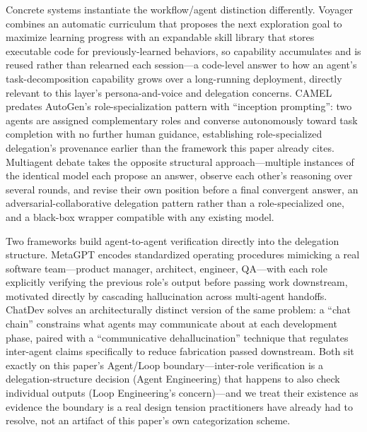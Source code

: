 \documentclass[journal]{IEEEtran}
\begin{document}
Concrete systems instantiate the workflow/agent distinction differently. Voyager \cite{wang2023voyager} combines an automatic curriculum that proposes the next exploration goal to maximize learning progress with an expandable skill library that stores executable code for previously-learned behaviors, so capability accumulates and is reused rather than relearned each session---a code-level answer to how an agent's task-decomposition capability grows over a long-running deployment, directly relevant to this layer's persona-and-voice and delegation concerns. CAMEL \cite{li2023camel} predates AutoGen's role-specialization pattern with ``inception prompting'': two agents are assigned complementary roles and converse autonomously toward task completion with no further human guidance, establishing role-specialized delegation's provenance earlier than the framework this paper already cites. Multiagent debate \cite{du2023debate} takes the opposite structural approach---multiple instances of the identical model each propose an answer, observe each other's reasoning over several rounds, and revise their own position before a final convergent answer, an adversarial-collaborative delegation pattern rather than a role-specialized one, and a black-box wrapper compatible with any existing model.

Two frameworks build agent-to-agent verification directly into the delegation structure. MetaGPT \cite{hong2023metagpt} encodes standardized operating procedures mimicking a real software team---product manager, architect, engineer, QA---with each role explicitly verifying the previous role's output before passing work downstream, motivated directly by cascading hallucination across multi-agent handoffs. ChatDev \cite{qian2023chatdev} solves an architecturally distinct version of the same problem: a ``chat chain'' constrains what agents may communicate about at each development phase, paired with a ``communicative dehallucination'' technique that regulates inter-agent claims specifically to reduce fabrication passed downstream. Both sit exactly on this paper's Agent/Loop boundary---inter-role verification is a delegation-structure decision (Agent Engineering) that happens to also check individual outputs (Loop Engineering's concern)---and we treat their existence as evidence the boundary is a real design tension practitioners have already had to resolve, not an artifact of this paper's own categorization scheme.
\end{document}
